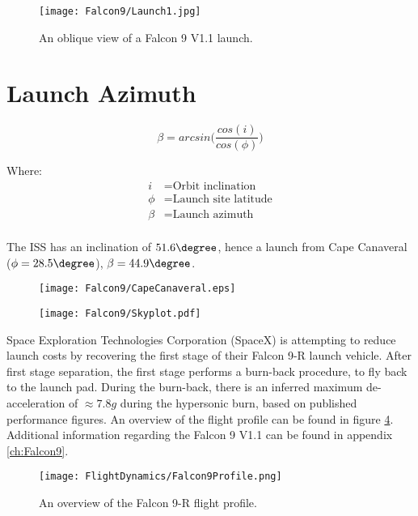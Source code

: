 \begin{figure}[!htb] 
    \centering
    \texttt{[image: Falcon9/Launch1.jpg]}
    \caption{An oblique view of a Falcon 9 V1.1 launch. \cite{SpaceXFalcon9}}
    \label{fig:Falcon9Launch}
\end{figure}


\section{Launch Azimuth}

\begin{equation}
\beta = arcsin \Big(\frac{cos(i)}{cos(\phi)}\Big)
\end{equation}

Where:
\begin{align*}
 i &= \text{Orbit inclination}\\
 \phi &= \text{Launch site latitude}\\
 \beta &= \text{Launch azimuth}\\
\end{align*}

\cite{LaunchDesign}

The \ac{ISS} has an inclination of $51.6\degree$, hence a launch from Cape Canaveral ($\phi = 28.5\degree$), $\beta=44.9\degree$.


\begin{figure}[!htb] 
    \centering
    \texttt{[image: Falcon9/CapeCanaveral.eps]}
    \caption{}
    \label{fig:LaunchPath}
\end{figure}


\begin{figure}[!htb] 
    \centering
    \texttt{[image: Falcon9/Skyplot.pdf]}
    \caption{}
    \label{fig:Skyplot}
\end{figure}



Space Exploration Technologies Corporation (SpaceX) is attempting to reduce launch costs by recovering the first stage of their Falcon 9-R launch vehicle. After first stage separation, the first stage performs a burn-back procedure, to fly back to the launch pad. During the burn-back, there is an inferred maximum de-acceleration of $\approx 7.8 g$ during the hypersonic burn, based on published performance figures. An overview of the flight profile can be found in figure \ref{fig:Falcon9Profile}. Additional information regarding the Falcon 9 V1.1 can be found in appendix \ref{ch:Falcon9}.

\begin{figure}[!htb] 
    \centering
    \texttt{[image: FlightDynamics/Falcon9Profile.png]} 
    \caption{An overview of the Falcon 9-R flight profile.}
    \label{fig:Falcon9Profile}
\end{figure}




